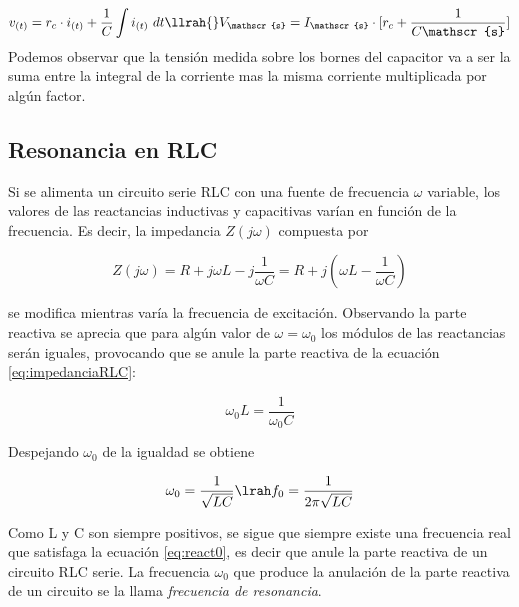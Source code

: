 \begin{equation}
    v_{(t)}=r_c\cdot i_{(t)} + \frac{1}{C}\int i_{(t)}~dt\llrah{}V_\mathscr{s}=I_\mathscr{s}\cdot[r_c+\frac{1}{C\mathscr{s}}]
\end{equation}
Podemos observar que la tensión medida sobre los bornes del capacitor va a ser la suma entre la integral de la corriente mas la misma corriente multiplicada por algún factor.

\subsection{Resonancia en RLC}

Si se alimenta un circuito serie RLC con una fuente de frecuencia $\omega$
variable, los valores de las reactancias inductivas y capacitivas varían en
función de la frecuencia. Es decir, la impedancia $Z(j\omega)$ compuesta por

\begin{equation}
    Z(j\omega) = R + j\omega L - j \frac{1}{\omega C} = R + j(\omega L - \frac{1}{\omega C})
    \label{eq:impedanciaRLC}
\end{equation}

se modifica mientras varía la frecuencia de excitación. Observando la parte reactiva se aprecia que para algún valor de $\omega=\omega_0$ los módulos de las reactancias serán iguales, provocando que se anule la parte reactiva de la ecuación \ref{eq:impedanciaRLC}:

\begin{equation}
    \omega_0 L = \frac{1}{\omega_0 C}
    \label{eq:react0}
\end{equation}

Despejando $\omega_0$ de la igualdad \label{eq:react0} se obtiene

\begin{equation}
    \omega_0 = \frac{1}{\sqrt{LC}} \lrah f_0 = \frac{1}{2\pi\sqrt{LC}}
\end{equation}

Como L y C son siempre positivos, se sigue que
siempre existe una frecuencia real que satisfaga la ecuación \ref{eq:react0}, es decir que anule la parte reactiva de un circuito RLC serie. La frecuencia $\omega_0$ que produce la anulación de la parte reactiva de un circuito se la llama \textit{frecuencia de resonancia}.



